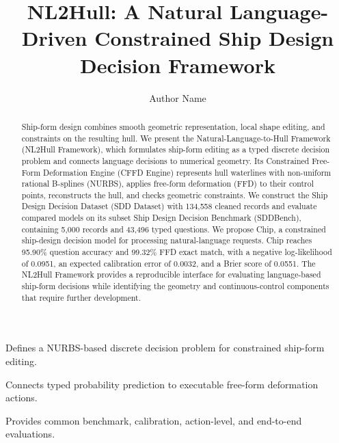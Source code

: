 \documentclass[a4paper,fleqn]{cas-dc}
\begin{document}
\let\WriteBookmarks\relax
\def\floatpagepagefraction{1}
\def\textpagefraction{.001}


\title [mode = title]{NL2Hull: A Natural Language-Driven Constrained Ship Design Decision Framework}

\author[1]{Author Name}
\cormark[1]

\begin{abstract}
Ship-form design combines smooth geometric representation, local shape editing,
and constraints on the resulting hull. We present the Natural-Language-to-Hull
Framework (NL2Hull Framework), which formulates ship-form editing as a typed
discrete decision problem and connects language decisions to numerical geometry.
Its Constrained Free-Form Deformation Engine (CFFD Engine) represents hull
waterlines with non-uniform rational B-splines (NURBS), applies free-form
deformation (FFD) to their control points, reconstructs the hull, and checks
geometric constraints. We construct the Ship Design Decision Dataset (SDD
Dataset) with 134,558 cleaned records and evaluate compared models on its subset
Ship Design Decision Benchmark (SDDBench), containing 5,000 records and 43,496
typed questions. We propose Chip, a constrained ship-design decision model for processing natural-language requests. Chip reaches 95.90\%
question accuracy and 99.32\% FFD exact match, with a negative log-likelihood of
0.0951, an expected calibration error of 0.0032, and a Brier score of 0.0551.
The NL2Hull Framework provides a reproducible interface for evaluating language-based ship-form decisions while
identifying the geometry and continuous-control components that require further
development.
\end{abstract}

\begin{highlights}
\item Defines a NURBS-based discrete decision problem for constrained ship-form editing.
\item Connects typed probability prediction to executable free-form deformation actions.
\item Provides common benchmark, calibration, action-level, and end-to-end evaluations.
\end{highlights}
\end{document}
